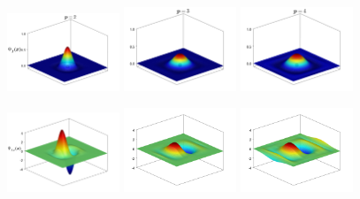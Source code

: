 \begin{figure}[H]
\centering
\begin{subcaptiongroup}
\includegraphics[width=0.3\textwidth]{figure/nomesh/QD41/1.png}
\includegraphics[width=0.3\textwidth]{figure/nomesh/C41/1.png}
\includegraphics[width=0.3\textwidth]{figure/nomesh/QT41/1.png}
\end{subcaptiongroup}
 \begin{subcaptiongroup}
\includegraphics[width=0.3\textwidth]{figure/nomesh/QD41/2.png}
\includegraphics[width=0.3\textwidth]{figure/nomesh/C41/2.png}
\includegraphics[width=0.3\textwidth]{figure/nomesh/QT41/2.png}

\end{subcaptiongroup}
\end{figure}
